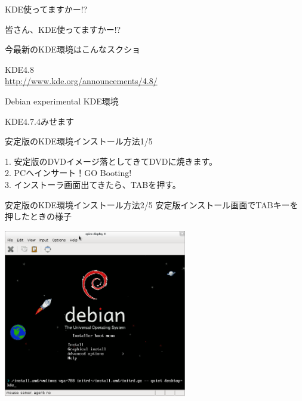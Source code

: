 \begin{frame}{KDE使ってますかー!?}
\begin{center}
\Large
皆さん、KDE使ってますかー!?
\end{center}
\end{frame}

\begin{frame}{今最新のKDE環境はこんなスクショ}
\begin{center}
\Large
KDE4.8\\
\url{http://www.kde.org/announcements/4.8/}
\end{center}
\end{frame}

\begin{frame}{Debian experimental KDE環境}
\begin{center}
\Large
KDE4.7.4みせます\\
\end{center}
\end{frame}


\begin{frame}{安定版のKDE環境インストール方法1/5}

1. 安定版のDVDイメージ落としてきてDVDに焼きます。\\
2. PCへインサート！GO Booting! \\
3. インストーラ画面出てきたら、TABを押す。

\end{frame}

\begin{frame}{安定版のKDE環境インストール方法2/5}
安定版インストール画面でTABキーを押したときの様子
\begin{center}
\includegraphics[width=8cm]{image201202/kdedesk/stable-inst-menu.png}
\end{center}
\end{frame}

